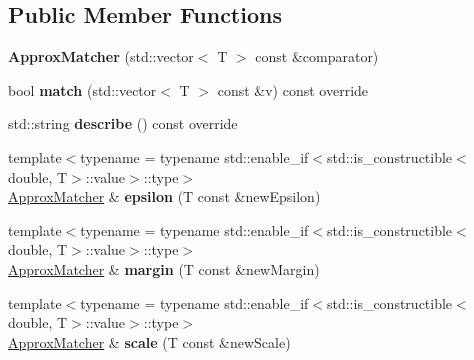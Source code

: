 \subsection*{Public Member Functions}
\begin{DoxyCompactItemize}
\item 
\mbox{\label{structCatch_1_1Matchers_1_1Vector_1_1ApproxMatcher_a55e8f7018104e0730eef656a61646870}} 
{\bfseries Approx\+Matcher} (std\+::vector$<$ T $>$ const \&comparator)
\item 
\mbox{\label{structCatch_1_1Matchers_1_1Vector_1_1ApproxMatcher_a9cbd62093c4c123f1984726e1a14b270}} 
bool {\bfseries match} (std\+::vector$<$ T $>$ const \&v) const override
\item 
\mbox{\label{structCatch_1_1Matchers_1_1Vector_1_1ApproxMatcher_a1a9237e24c513c1448fa0624b3e14232}} 
std\+::string {\bfseries describe} () const override
\item 
\mbox{\label{structCatch_1_1Matchers_1_1Vector_1_1ApproxMatcher_a319b3a7fa9d0f401bfda5b45dafbbf5a}} 
{\footnotesize template$<$typename  = typename std\+::enable\+\_\+if$<$std\+::is\+\_\+constructible$<$double, T$>$\+::value$>$\+::type$>$ }\\\hyperlink{structCatch_1_1Matchers_1_1Vector_1_1ApproxMatcher}{Approx\+Matcher} \& {\bfseries epsilon} (T const \&new\+Epsilon)
\item 
\mbox{\label{structCatch_1_1Matchers_1_1Vector_1_1ApproxMatcher_ac3b3afb3e5a9ad9ee0516e0202e08959}} 
{\footnotesize template$<$typename  = typename std\+::enable\+\_\+if$<$std\+::is\+\_\+constructible$<$double, T$>$\+::value$>$\+::type$>$ }\\\hyperlink{structCatch_1_1Matchers_1_1Vector_1_1ApproxMatcher}{Approx\+Matcher} \& {\bfseries margin} (T const \&new\+Margin)
\item 
\mbox{\label{structCatch_1_1Matchers_1_1Vector_1_1ApproxMatcher_a8658dc0564e0f80f101e4574830a3b18}} 
{\footnotesize template$<$typename  = typename std\+::enable\+\_\+if$<$std\+::is\+\_\+constructible$<$double, T$>$\+::value$>$\+::type$>$ }\\\hyperlink{structCatch_1_1Matchers_1_1Vector_1_1ApproxMatcher}{Approx\+Matcher} \& {\bfseries scale} (T const \&new\+Scale)
\end{DoxyCompactItemize}
